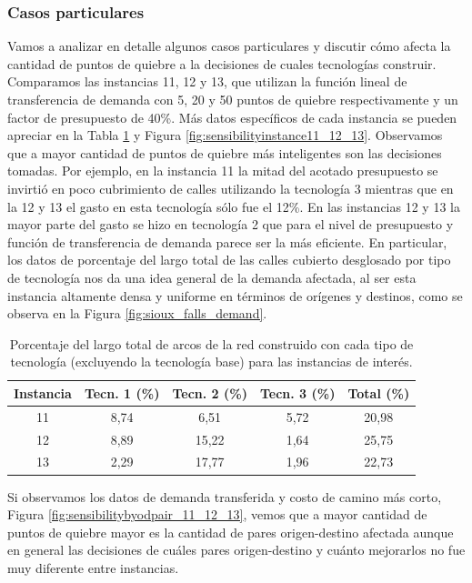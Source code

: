 \documentclass{article}
\begin{document}
  \FloatBarrier
  \subsubsection*{Casos particulares}

  Vamos a analizar en detalle algunos casos particulares y discutir cómo afecta la cantidad de puntos de quiebre a la decisiones de cuales tecnologías construir. Comparamos las instancias 11, 12 y 13, que utilizan la función lineal de transferencia de demanda con 5, 20 y 50 puntos de quiebre respectivamente y un factor de presupuesto de 40\%. Más datos específicos de cada instancia se pueden apreciar en la Tabla \ref{table:sensibilityinfralengths} y Figura \ref{fig:sensibilityinstance11_12_13}. Observamos que a mayor cantidad de puntos de quiebre más inteligentes son las decisiones tomadas. Por ejemplo, en la instancia 11 la mitad del acotado presupuesto se invirtió en poco cubrimiento de calles utilizando la tecnología 3 mientras que en la 12 y 13 el gasto en esta tecnología sólo fue el 12\%. En las instancias 12 y 13 la mayor parte del gasto se hizo en tecnología 2 que para el nivel de presupuesto y función de transferencia de demanda parece ser la más eficiente. En particular, los datos de porcentaje del largo total de las calles cubierto desglosado por tipo de tecnología nos da una idea general de la demanda afectada, al ser esta instancia altamente densa y uniforme en términos de orígenes y destinos, como se observa en la Figura \ref{fig:sioux_falls_demand}.

   \begin{table}[h!]
    \centering
    \begin{tabular}{ccccc}
      \toprule
        Instancia & Tecn. 1 (\%) & Tecn. 2 (\%) & Tecn. 3 (\%) & Total (\%) \\
      \midrule
        11 & 8,74  & 6,51   & 5,72 & 20,98 \\
        12 & 8,89  & 15,22  & 1,64 & 25,75 \\
        13 & 2,29  & 17,77  & 1,96 & 22,73 \\
      \bottomrule
    \end{tabular}
    \caption{Porcentaje del largo total de arcos de la red construido con cada tipo de tecnología (excluyendo la tecnología base) para las instancias de interés.}\label{table:sensibilityinfralengths}
  \end{table}

 Si observamos los datos de demanda transferida y costo de camino más corto, Figura \ref{fig:sensibilitybyodpair_11_12_13}, vemos que a mayor cantidad de puntos de quiebre mayor es la cantidad de pares origen-destino afectada aunque en general las decisiones de cuáles pares origen-destino y cuánto mejorarlos no fue muy diferente entre instancias.
\end{document}
